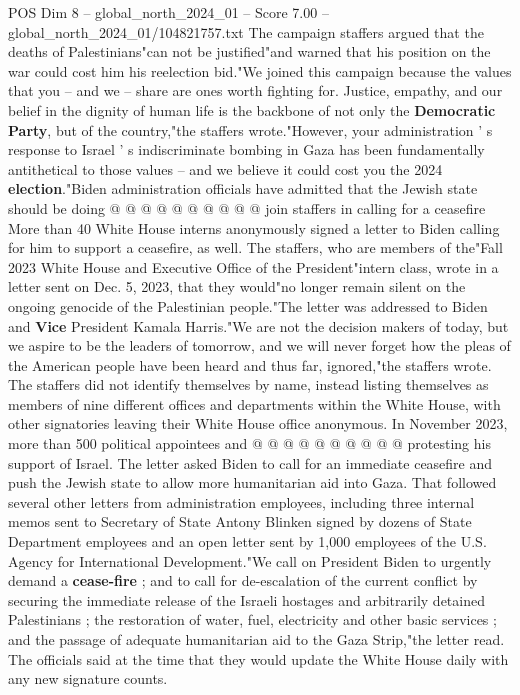 \begin{textsample}{POS Dim 8 – global\_north\_2024\_01 – Score 7.00 – global\_north\_2024\_01/104821757.txt}
The campaign staffers argued that the deaths of Palestinians"can not be justified"and warned that his position on the war could cost him his reelection bid."We joined this campaign because the values that you -- and we -- share are ones worth fighting for.
Justice, empathy, and our belief in the dignity of human life is the backbone of not only the \textbf{Democratic} \textbf{Party}, but of the country,"the staffers wrote."However, your administration ' s response to Israel ' s indiscriminate bombing in Gaza has been fundamentally antithetical to those values -- and we believe it could cost you the 2024 \textbf{election}."Biden administration officials have admitted that the Jewish state should be doing @ @ @ @ @ @ @ @ @ @ join staffers in calling for a ceasefire More than 40 White House interns anonymously signed a letter to Biden calling for him to support a ceasefire, as well.
The staffers, who are members of the"Fall 2023 White House and Executive Office of the President"intern class, wrote in a letter sent on Dec. 5, 2023, that they would"no longer remain silent on the ongoing genocide of the Palestinian people."The letter was addressed to Biden and \textbf{Vice} President Kamala Harris."We are not the decision makers of today, but we aspire to be the leaders of tomorrow, and we will never forget how the pleas of the American people have been heard and thus far, ignored,"the staffers wrote.
The staffers did not identify themselves by name, instead listing themselves as members of nine different offices and departments within the White House, with other signatories leaving their White House office anonymous.
In November 2023, more than 500 political appointees and @ @ @ @ @ @ @ @ @ @ protesting his support of Israel.
The letter asked Biden to call for an immediate ceasefire and push the Jewish state to allow more humanitarian aid into Gaza.
That followed several other letters from administration employees, including three internal memos sent to Secretary of State Antony Blinken signed by dozens of State Department employees and an open letter sent by 1,000 employees of the U.S.
Agency for International Development."We call on President Biden to urgently demand a \textbf{cease-fire} ; and to call for de-escalation of the current conflict by securing the immediate release of the Israeli hostages and arbitrarily detained Palestinians ; the restoration of water, fuel, electricity and other basic services ; and the passage of adequate humanitarian aid to the Gaza Strip,"the letter read.
The officials said at the time that they would update the White House daily with any new signature counts.

\end{textsample}

